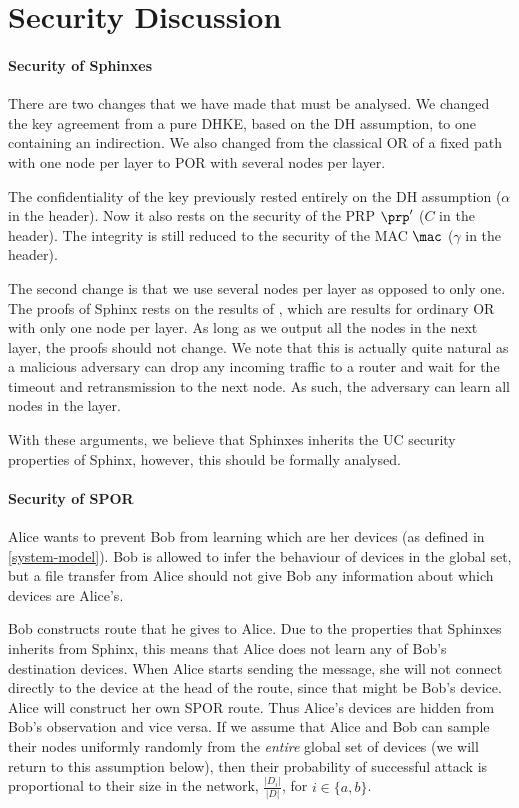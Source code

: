 \section{Security Discussion}%
\label{security-discussion}

\paragraph*{Security of Sphinxes}

There are two changes that we have made that must be analysed.
We changed the key agreement from a pure \ac{DHKE}, \ie based on the \ac{DH} 
assumption, to one containing an indirection.
We also changed from the classical \ac{OR} of a fixed path with one node per 
layer to \ac{POR} with several nodes per layer.

The confidentiality of the key previously rested entirely on the \ac{DH} 
assumption (\(\alpha\) in the header).
Now it also rests on the security of the \ac{PRP} \(\prp'\) (\(C\) in the 
header).
The integrity is still reduced to the security of the \ac{MAC} \(\mac\) 
(\(\gamma\) in the header).

The second change is that we use several nodes per layer as opposed to only 
one.
The proofs of Sphinx rests on the results of \textcite{CLOnionRouting}, which 
are results for ordinary \ac{OR} with only one node per layer.
As long as we output all the nodes in the next layer, the proofs should not 
change.
We note that this is actually quite natural as a malicious adversary can drop 
any incoming traffic to a router and wait for the timeout and retransmission to 
the next node.
As such, the adversary can learn all nodes in the layer.

With these arguments, we believe that Sphinxes inherits the \ac{UC} security 
properties of Sphinx, however, this should be formally analysed.

\paragraph*{Security of \acs*{SPOR}}

Alice wants to prevent Bob from learning which are her devices (as defined in 
\cref{system-model}).
Bob is allowed to infer the behaviour of devices in the global set,
but a file transfer from Alice should not give Bob any information about which 
devices are Alice's.

Bob constructs  route that he gives to Alice.
Due to the properties that Sphinxes inherits from Sphinx, this means that Alice 
does not learn any of Bob's destination devices.
When Alice starts sending the message, she will not connect directly to the 
device at the head of the route, since that might be Bob's device.
Alice will construct her own \ac{SPOR} route.
Thus Alice's devices are hidden from Bob's observation and vice versa.
If we assume that Alice and Bob can sample their nodes uniformly randomly from 
the \emph{entire} global set of devices %
(we will return to this assumption 
below), then their probability of successful attack is proportional to their 
size in the network, \ie \(\frac{|D_i|}{|D|}\), for \(i\in \{a,b\}\).

